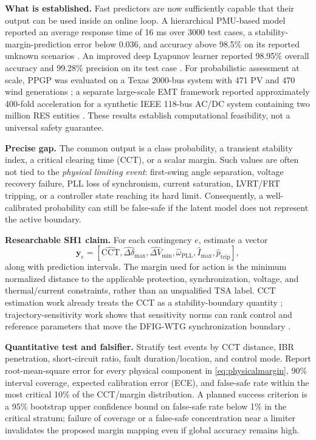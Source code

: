\documentclass[conference]{IEEEtran}
\begin{document}
\textbf{What is established.} Fast predictors are now sufficiently capable that their output can be used inside an online loop. A hierarchical PMU-based model reported an average response time of 16 ms over 3000 test cases, a stability-margin-prediction error below 0.036, and accuracy above 98.5\% on its reported unknown scenarios \cite{zhu2020}. An improved deep Lyapunov learner reported 98.95\% overall accuracy and 99.28\% precision on its test case \cite{liu2024dll}. For probabilistic assessment at scale, PPGP was evaluated on a Texas 2000-bus system with 471 PV and 470 wind generations \cite{ye2024ppgp}; a separate large-scale EMT framework reported approximately 400-fold acceleration for a synthetic IEEE 118-bus AC/DC system containing two million RES entities \cite{cheng2025}. These results establish computational feasibility, not a universal safety guarantee.

\textbf{Precise gap.} The common output is a class probability, a transient stability index, a critical clearing time (CCT), or a scalar margin. Such values are often not tied to the \emph{physical limiting event}: first-swing angle separation, voltage recovery failure, PLL loss of synchronism, current saturation, LVRT/FRT tripping, or a controller state reaching its hard limit. Consequently, a well-calibrated probability can still be false-safe if the latent model does not represent the active boundary.

\textbf{Researchable SH1 claim.} For each contingency $e$, estimate a vector
\begin{equation}
\mathbf{y}_e=[\widehat{\mathrm{CCT}},\widehat{\Delta\delta}_{\max},
\widehat{\Delta V}_{\min},\widehat{\omega}_{\mathrm{PLL}},
\widehat{I}_{\max},\widehat{p}_{\mathrm{trip}}],
\label{eq:physicalmargin}
\end{equation}
along with prediction intervals. The margin used for action is the minimum normalized distance to the applicable protection, synchronization, voltage, and thermal/current constraints, rather than an unqualified TSA label. CCT estimation work already treats the CCT as a stability-boundary quantity \cite{su2024margin}; trajectory-sensitivity work shows that sensitivity norms can rank control and reference parameters that move the DFIG-WTG synchronization boundary \cite{buragohain2024}.

\textbf{Quantitative test and falsifier.} Stratify test events by CCT distance, IBR penetration, short-circuit ratio, fault duration/location, and control mode. Report root-mean-square error for every physical component in \eqref{eq:physicalmargin}, 90\% interval coverage, expected calibration error (ECE), and false-safe rate within the most critical 10\% of the CCT/margin distribution. A planned success criterion is a 95\% bootstrap upper confidence bound on false-safe rate below 1\% in the critical stratum; failure of coverage or a false-safe concentration near a limiter invalidates the proposed margin mapping even if global accuracy remains high.
\end{document}
